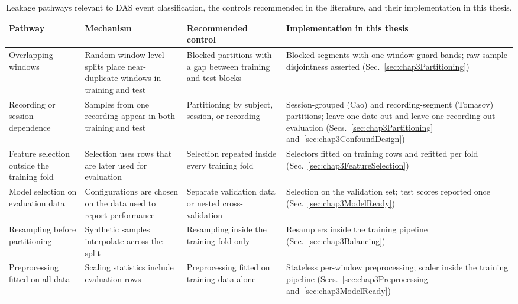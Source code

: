 \begin{table}[!htbp]
	\centering
	\caption{Leakage pathways relevant to DAS event classification, the controls recommended in the literature, and their implementation in this thesis.}
	\label{tab:leakage_controls}
	\footnotesize
	\setlength{\tabcolsep}{4pt}
	\renewcommand{\arraystretch}{1.15}
	\begin{tabularx}{\textwidth}{@{}>{\raggedright\arraybackslash}p{2.3cm} >{\raggedright\arraybackslash}X >{\raggedright\arraybackslash}X >{\raggedright\arraybackslash}X@{}}
		\toprule
		\textbf{Pathway} & \textbf{Mechanism} & \textbf{Recommended control} & \textbf{Implementation in this thesis}\\
		\midrule
		Overlapping windows & Random window-level splits place near-duplicate windows in training and test & Blocked partitions with a gap between training and test blocks~\cite{burman1994hblock,racine2000hvblock,bergmeir2012timeseries,dehghani2019windows} & Blocked segments with one-window guard bands; raw-sample disjointness asserted (Sec.~\ref{sec:chap3Partitioning})\\
		\addlinespace[3pt]
		Recording or session dependence & Samples from one recording appear in both training and test & Partitioning by subject, session, or recording~\cite{saeb2017usecase,roberts2017crossvalidation} & Session-grouped (Cao) and recording-segment (Tomasov) partitions; leave-one-date-out and leave-one-recording-out evaluation (Secs.~\ref{sec:chap3Partitioning} and~\ref{sec:chap3ConfoundDesign})\\
		\addlinespace[3pt]
		Feature selection outside the training fold & Selection uses rows that are later used for evaluation & Selection repeated inside every training fold~\cite{ambroise2002selection} & Selectors fitted on training rows and refitted per fold (Sec.~\ref{sec:chap3FeatureSelection})\\
		\addlinespace[3pt]
		Model selection on evaluation data & Configurations are chosen on the data used to report performance & Separate validation data or nested cross-validation~\cite{varma2006bias,cawley2010overfitting} & Selection on the validation set; test scores reported once (Sec.~\ref{sec:chap3ModelReady})\\
		\addlinespace[3pt]
		Resampling before partitioning & Synthetic samples interpolate across the split & Resampling inside the training fold only~\cite{santos2018imbalanced} & Resamplers inside the training pipeline (Sec.~\ref{sec:chap3Balancing})\\
		\addlinespace[3pt]
		Preprocessing fitted on all data & Scaling statistics include evaluation rows & Preprocessing fitted on training data alone~\cite{kapoor2023leakage} & Stateless per-window preprocessing; scaler inside the training pipeline (Secs.~\ref{sec:chap3Preprocessing} and~\ref{sec:chap3ModelReady})\\

\end{tabularx}
\end{table}
